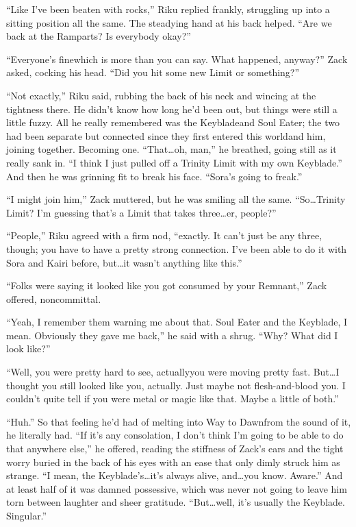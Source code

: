 ``Like I've been beaten with rocks,'' Riku replied frankly, struggling up into a sitting position all the same. The steadying hand at his back helped. ``Are we back at the Ramparts? Is everybody okay?''

``Everyone's fine\textemdash which is more than you can say. What happened, anyway?'' Zack asked, cocking his head. ``Did you hit some new Limit or something?''

``Not exactly,'' Riku said, rubbing the back of his neck and wincing at the tightness there. He didn't know how long he'd been out, but things were still a little fuzzy. All he really remembered was the Keyblade\textemdash and Soul Eater; the two had been separate but connected since they first entered this world\textemdash and him, joining together. Becoming one. ``That\ldots oh, man,'' he breathed, going still as it really sank in. ``I think I just pulled off a Trinity Limit with my own Keyblade.'' And then he was grinning fit to break his face. ``Sora's going to freak.''

``I might join him,'' Zack muttered, but he was smiling all the same. ``So\ldots Trinity Limit? I'm guessing that's a Limit that takes three\ldots er, people?''

``People,'' Riku agreed with a firm nod, ``exactly. It can't just be any three, though; you have to have a pretty strong connection. I've been able to do it with Sora and Kairi before, but\ldots it wasn't anything like this.''

``Folks were saying it looked like you got consumed by your Remnant,'' Zack offered, noncommittal.

``Yeah, I remember them warning me about that. Soul Eater and the Keyblade, I mean. Obviously they gave me back,'' he said with a shrug. ``Why? What did I look like?''

``Well, you were pretty hard to see, actually\textemdash you were moving pretty fast. But\ldots I thought you still looked like you, actually. Just maybe not flesh-and-blood you. I couldn't quite tell if you were metal or magic like that. Maybe a little of both.''

``Huh.'' So that feeling he'd had of melting into Way to Dawn\textemdash from the sound of it, he literally had. ``If it's any consolation, I don't think I'm going to be able to do that anywhere else,'' he offered, reading the stiffness of Zack's ears and the tight worry buried in the back of his eyes with an ease that only dimly struck him as strange. ``I mean, the Keyblade's\ldots it's always alive, and\ldots you know. Aware.'' And at least half of it was damned possessive, which was never not going to leave him torn between laughter and sheer gratitude. ``But\ldots well, it's usually the Keyblade. Singular.''

